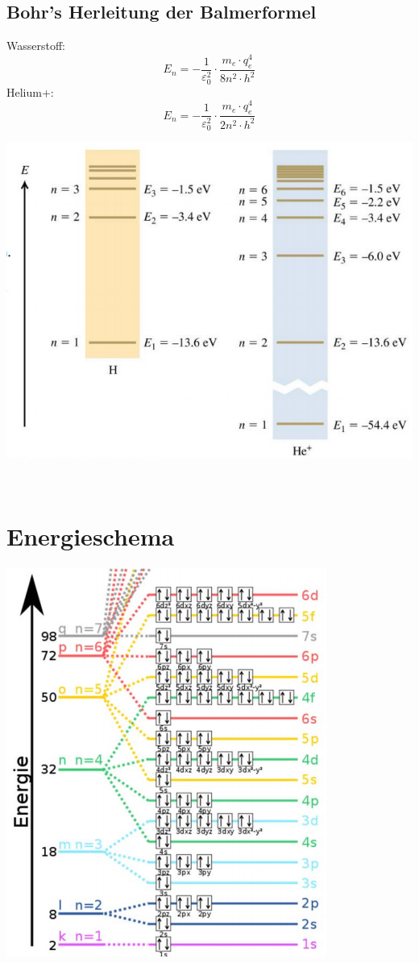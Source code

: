 \subsection{Bohr's Herleitung der Balmerformel}
Wasserstoff:
\[
	E_n= - \frac{1}{\varepsilon_0^2}\cdot\frac{m_e\cdot q_e^4}{8n^2\cdot h^2}
\]
Helium+:
\[
	E_n= - 
	\frac{1}{\varepsilon_0^2}\cdot\frac{m_e\cdot q_e^4}{2n^2\cdot h^2}
\]
\begin{center}
	\includegraphics[scale = 0.25]{images/bhor_herleitung.jpg}
\end{center}
\
\\
\section{Energieschema}
\begin{center}
	\includegraphics[scale = 0.3]{images/energieschema.jpg}
\end{center}
\
\\
